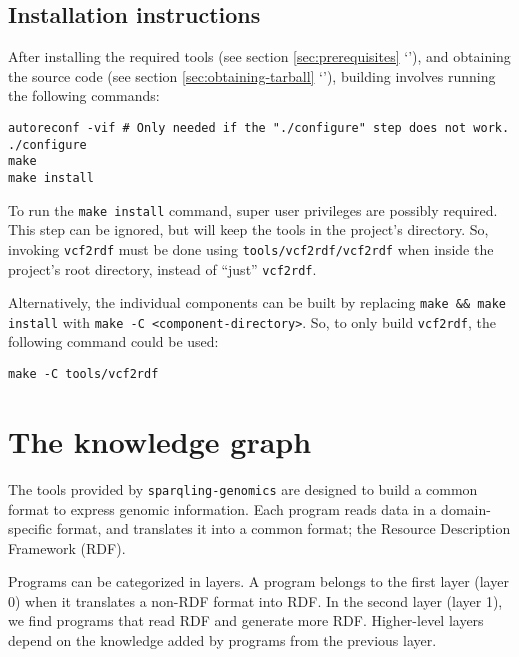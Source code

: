 \section{Installation instructions}

  After installing the required tools (see section \ref{sec:prerequisites}
  {\color{LinkGray}`'}), and obtaining the source
  code (see section \ref{sec:obtaining-tarball} {\color{LinkGray}
    `'}), building involves running the following
  commands:

\begin{siderules}
\begin{verbatim}
autoreconf -vif # Only needed if the "./configure" step does not work.
./configure
make
make install
\end{verbatim}
\end{siderules}

  To run the \texttt{make install} command, super user privileges are possibly
  required.  This step can be ignored, but will keep the tools in the project's
  directory.  So, invoking \texttt{vcf2rdf} must be done using
  \texttt{tools/vcf2rdf/vcf2rdf} when inside the project's root directory,
  instead of ``just'' \texttt{vcf2rdf}.

Alternatively, the individual components can be built by replacing
\texttt{make \&\& make install} with \texttt{make -C <component-directory>}.
So, to only build \texttt{vcf2rdf}, the following command could be used:
\begin{siderules}
\begin{verbatim}
make -C tools/vcf2rdf
\end{verbatim}
\end{siderules}

\chapter{The knowledge graph}

  The tools provided by \texttt{sparqling-genomics} are designed to build a
  common format to express genomic information.  Each program reads data in
  a domain-specific format, and translates it into a common format; the
  Resource Description Framework (RDF).

  Programs can be categorized in layers.  A program belongs to the first
  layer (layer 0) when it translates a non-RDF format into RDF.  In the
  second layer (layer 1), we find programs that read RDF and generate more
  RDF.  Higher-level layers depend on the knowledge added by programs from
  the previous layer.

